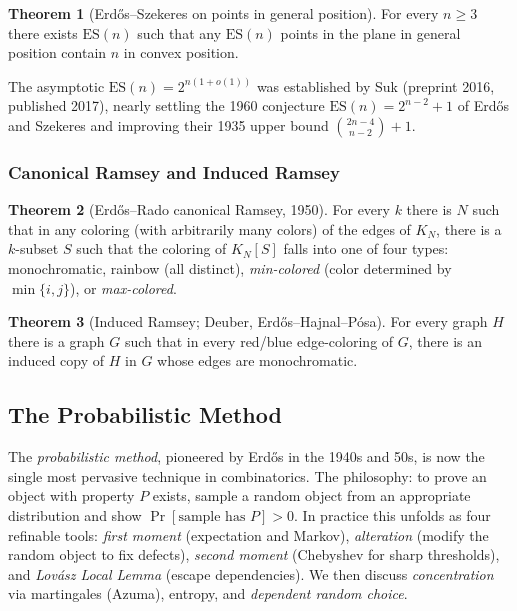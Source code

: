 \documentclass{article}
\theoremstyle{definition}
\newtheorem{theorem}{Theorem}
\begin{document}
\begin{theorem}[Erd\H{o}s--Szekeres on points in general position]
For every $n \ge 3$ there exists $\mathrm{ES}(n)$ such that any
$\mathrm{ES}(n)$ points in the plane in general position contain $n$
in convex position.
\end{theorem}

The asymptotic $\mathrm{ES}(n) = 2^{n(1 + o(1))}$ was established by
Suk (preprint 2016, published 2017), nearly settling the 1960 conjecture
$\mathrm{ES}(n) = 2^{n-2} + 1$ of Erd\H{o}s and Szekeres and improving
their 1935 upper bound $\binom{2n-4}{n-2} + 1$.

\subsubsection{Canonical Ramsey and Induced Ramsey}

\begin{theorem}[Erd\H{o}s--Rado canonical Ramsey, 1950]
For every $k$ there is $N$ such that in any coloring (with arbitrarily
many colors) of the edges of $K_N$, there is a $k$-subset $S$ such
that the coloring of $K_N[S]$ falls into one of four types:
monochromatic, rainbow (all distinct), \emph{min-colored} (color
determined by $\min\{i, j\}$), or \emph{max-colored}.
\end{theorem}

\begin{theorem}[Induced Ramsey; Deuber, Erd\H{o}s--Hajnal--P\'osa]
For every graph $H$ there is a graph $G$ such that in every red/blue
edge-coloring of $G$, there is an induced copy of $H$ in $G$ whose
edges are monochromatic.
\end{theorem}

\subsection{The Probabilistic Method}

The \emph{probabilistic method}, pioneered by Erd\H{o}s in the 1940s
and 50s, is now the single most pervasive technique in combinatorics.
The philosophy: to prove an object with property $P$ exists, sample a
random object from an appropriate distribution and show
$\Pr[\text{sample has } P] > 0$. In practice this unfolds as four
refinable tools: \emph{first moment} (expectation and Markov),
\emph{alteration} (modify the random object to fix defects),
\emph{second moment} (Chebyshev for sharp thresholds), and
\emph{Lov\'asz Local Lemma} (escape dependencies). We then discuss
\emph{concentration} via martingales (Azuma), entropy, and
\emph{dependent random choice}.
\end{document}
